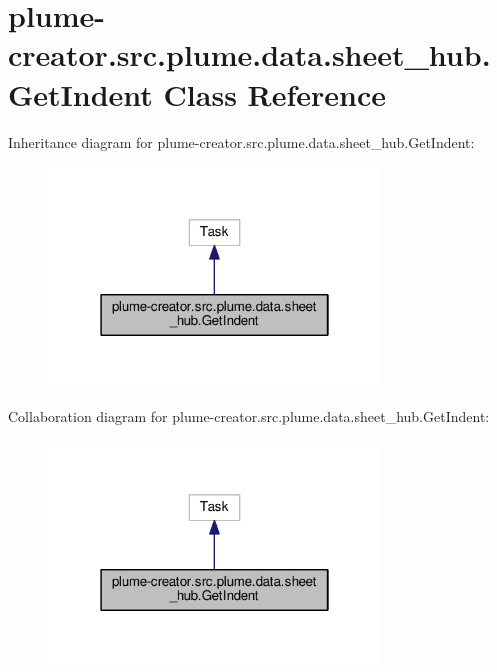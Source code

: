 \hypertarget{classplume-creator_1_1src_1_1plume_1_1data_1_1sheet__hub_1_1_get_indent}{}\section{plume-\/creator.src.\+plume.\+data.\+sheet\+\_\+hub.\+Get\+Indent Class Reference}
\label{classplume-creator_1_1src_1_1plume_1_1data_1_1sheet__hub_1_1_get_indent}


Inheritance diagram for plume-\/creator.src.\+plume.\+data.\+sheet\+\_\+hub.\+Get\+Indent\+:\nopagebreak
\begin{figure}[H]
\begin{center}
\leavevmode
\includegraphics[width=250pt]{classplume-creator_1_1src_1_1plume_1_1data_1_1sheet__hub_1_1_get_indent__inherit__graph}
\end{center}
\end{figure}


Collaboration diagram for plume-\/creator.src.\+plume.\+data.\+sheet\+\_\+hub.\+Get\+Indent\+:\nopagebreak
\begin{figure}[H]
\begin{center}
\leavevmode
\includegraphics[width=250pt]{classplume-creator_1_1src_1_1plume_1_1data_1_1sheet__hub_1_1_get_indent__coll__graph}
\end{center}
\end{figure}
